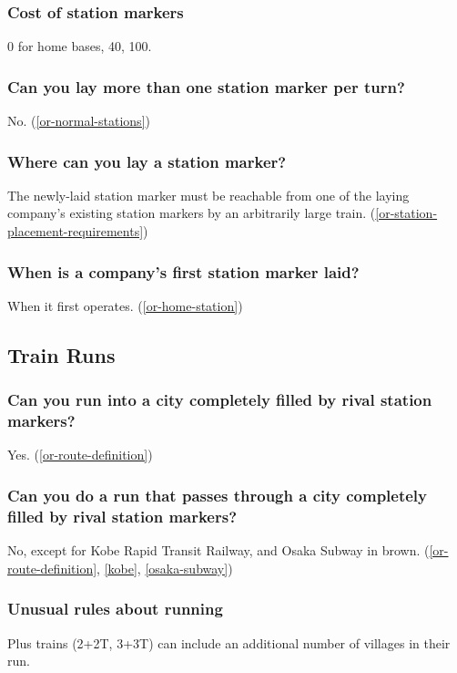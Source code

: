 \subsubsection{Cost of station markers}
0 for home bases, 40, 100.

\subsubsection{Can you lay more than one station marker per turn?}
No. (\autoref{or-normal-stations})

\subsubsection{Where can you lay a station marker?}
The newly-laid station marker must be reachable from one of the laying
company's existing station markers by an arbitrarily large
train. (\autoref{or-station-placement-requirements})

\subsubsection{When is a company's first station marker laid?}
When it first operates. (\autoref{or-home-station})

\subsection{Train Runs}

\subsubsection{Can you run into a city completely filled by rival station markers?}
Yes. (\autoref{or-route-definition})

\subsubsection{Can you do a run that passes through a city completely
  filled by rival station markers?}
No, except for Kobe Rapid Transit Railway, and Osaka Subway in
brown. (\autoref{or-route-definition}, \autoref{kobe},
\autoref{osaka-subway})

\subsubsection{Unusual rules about running}
Plus trains (2+2T, 3+3T) can include an additional number of villages
in their run.

